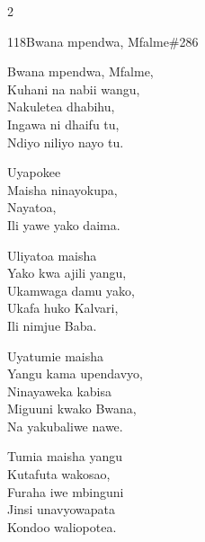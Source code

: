 \begin{multicols}{2}
\begin{hymn}{118}{Bwana mpendwa, Mfalme}{\#286}
\begin{stanza}
Bwana mpendwa, Mfalme,\\
Kuhani na nabii wangu,\\
Nakuletea dhabihu,\\
Ingawa ni dhaifu tu,\\
Ndiyo niliyo nayo tu.
\end{stanza}
\begin{chorus}
Uyapokee\\
Maisha ninayokupa,\\
Nayatoa,\\
Ili yawe yako daima.
\end{chorus}
\begin{stanza}
Uliyatoa maisha\\
Yako kwa ajili yangu,\\
Ukamwaga damu yako,\\
Ukafa huko Kalvari,\\
Ili nimjue Baba.
\end{stanza}
\begin{stanza}
Uyatumie maisha\\
Yangu kama upendavyo,\\
Ninayaweka kabisa\\
Miguuni kwako Bwana,\\
Na yakubaliwe nawe.
\end{stanza}
\begin{stanza}
Tumia maisha yangu\\
Kutafuta wakosao,\\
Furaha iwe mbinguni\\
Jinsi unavyowapata\\
Kondoo waliopotea.
\end{stanza}
\end{hymn}


\end{multicols}
